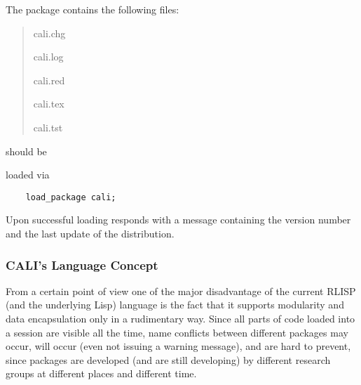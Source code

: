 The  package contains the following files:
\begin{quote}
cali.chg


cali.log


cali.red


cali.tex


cali.tst


\end{quote}

 should be
\iffalse
precompiled as usual, i.e.\ either using the \emph{makefasl} utility of \REDUCE or ``by hand'' via
\begin{verbatim}
    faslout "cali"$
    in "cali.red"$
    faslend$
\end{verbatim}
and then
\fi
loaded via
\begin{verbatim}
    load_package cali;
\end{verbatim}
Upon successful loading  responds with a message containing the
version number and the last update of the distribution.

\begin{center}
\end{center}

\subsubsection{CALI's Language Concept}

From a certain point of view one of the major disadvantage of the
current RLISP (and the underlying Lisp) language is the fact
that it supports modularity and data encapsulation only in a
rudimentary way.  Since all parts of code loaded into a session are
visible all the time, name conflicts between different packages may
occur, will occur (even not issuing a warning message), and are hard
to prevent, since packages are developed (and are still developing)
by different research groups at different places and different time.

